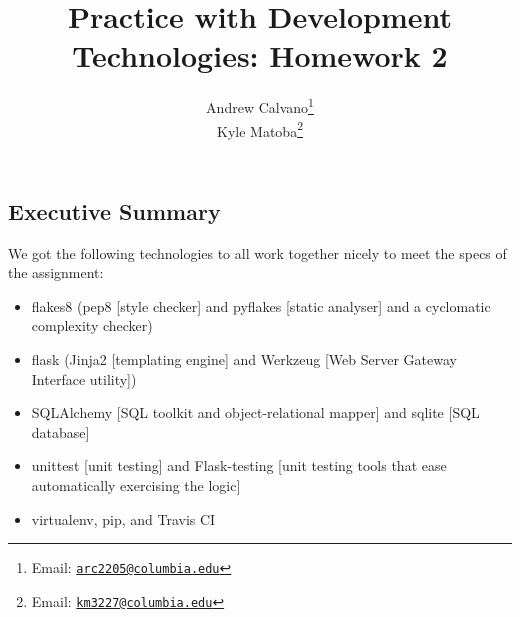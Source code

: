 \documentclass[10pt]{article}
\theoremstyle{remark}
\numberwithin{equation}{section}
\begin{document}
\title{Practice with Development Technologies: Homework 2 }

\author{
Andrew Calvano\thanks{Email: \href{mailto:arc2205@columbia.edu}{\texttt{arc2205@columbia.edu}}} \\ 
Kyle Matoba\thanks{Email: \href{mailto:km3227@columbia.edu}{\texttt{km3227@columbia.edu}}}
}
\date{}
\maketitle


\section{} 

\subsection{Executive Summary}

We got the following technologies to all work together nicely to meet the specs of the assignment:

\begin{itemize} 
\item flakes8 (pep8 [style checker] and pyflakes [static analyser] and a cyclomatic complexity checker)
\item flask (Jinja2 [templating engine] and Werkzeug [Web Server Gateway Interface utility])
\item SQLAlchemy [SQL toolkit and object-relational mapper] and sqlite [SQL database]
\item unittest [unit testing] and Flask-testing [unit testing tools that ease automatically exercising the logic]
\item virtualenv, pip, and Travis CI
\end{itemize} 
\end{document}
